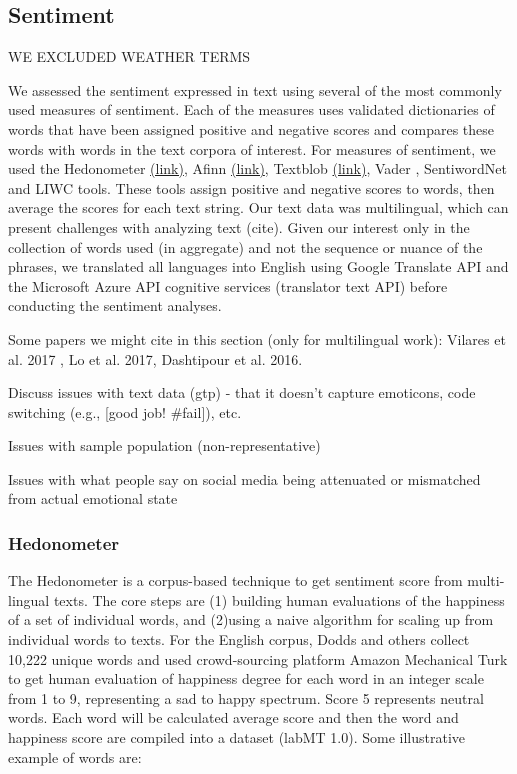 \documentclass{article}
\begin{document}
\subsection{Sentiment}

WE EXCLUDED WEATHER TERMS

We assessed the sentiment expressed in text using several of the most commonly used measures of sentiment. Each of the measures uses validated dictionaries of words that have been assigned positive and negative scores and compares these words with words in the text corpora of interest. For measures of sentiment, we used the Hedonometer \href{https://hedonometer.org/timeseries/en_all/}{(link)}, Afinn \href{http://corpustext.com/reference/sentiment_afinn.html}{(link)}, Textblob \href{https://textblob.readthedocs.io/en/dev/}{(link)}, Vader , SentiwordNet and LIWC tools. These tools assign positive and negative scores to words, then average the scores for each text string. Our text data was multilingual, which can present challenges with analyzing text (cite). Given our interest only in the collection of words used (in aggregate) and not the sequence or nuance of the phrases, we translated all languages into English using Google Translate API and the Microsoft Azure API cognitive services (translator text API) before conducting the sentiment analyses.

Some papers we might cite in this section (only for multilingual work): Vilares et al. 2017 , Lo et al. 2017, Dashtipour et al. 2016.

Discuss issues with text data (gtp) - that it doesn’t capture emoticons, code switching (e.g., [good job! \#fail]), etc.

Issues with sample population (non-representative)

Issues with what people say on social media being attenuated or mismatched from actual emotional state

\subsubsection{Hedonometer}
The Hedonometer \cite{dodds_temporal_2011} is a corpus-based technique to get sentiment score from multi-lingual texts. The core steps are (1) building human evaluations of the happiness of a set of individual words, and (2)using a naive algorithm for scaling up from individual words to texts. For the English corpus, Dodds and others \cite{dodds_temporal_2011} collect 10,222 unique words and used crowd-sourcing platform Amazon Mechanical Turk to get human evaluation of happiness degree for each word in an integer scale from 1 to 9, representing a sad to happy spectrum. Score 5 represents neutral words. Each word will be calculated average score and then the word and happiness score are compiled into a dataset (labMT 1.0). Some illustrative example of words are: 
\end{document}
